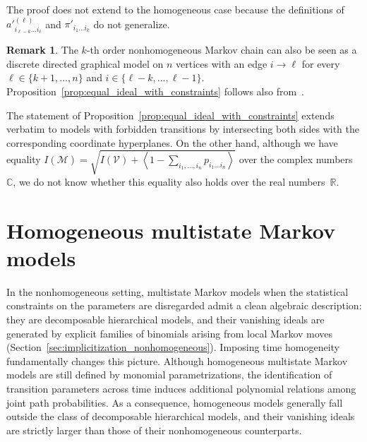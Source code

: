 \documentclass[11pt, a4paper]{article}
\numberwithin{equation}{section}
\theoremstyle{plain}
\theoremstyle{definition}
\newtheorem{remark}[theorem]{Remark}
\begin{document}
The proof does not extend to the homogeneous case because the definitions of $a'^{(\ell)}_{i_{\ell-k}\ldots i_\ell}$ and $\pi'_{i_1\ldots i_k}$ do not generalize.



\begin{remark} \label{rmk:nh_msm_as_graphical_models}
The $k$-th order nonhomogeneous Markov chain can also be seen as a discrete directed graphical model on $n$ vertices with an edge $i \rightarrow \ell$ for every $\ell \in \{k+1,\ldots,n\}$ and $i \in \{\ell-k,\ldots,\ell-1\}$. Proposition~\ref{prop:equal_ideal_with_constraints} follows also from~\cite[Theorem 3.27]{lauritzen1996graphical}.
\end{remark}




The statement of Proposition~\ref{prop:equal_ideal_with_constraints} extends verbatim to models with
forbidden transitions by intersecting both sides with the corresponding coordinate hyperplanes. On the other hand, although we have equality $I(\mathcal{M})=\textstyle{\sqrt{I(\mathcal{V}) + \left\langle 1-\sum_{i_1,\ldots, i_n}p_{i_1\ldots i_n} \right\rangle}}$ over the complex numbers~$\mathbb{C}$, we do not know whether this equality also holds
over the real numbers~$\mathbb{R}$. 







\section{Homogeneous multistate Markov  models}
\label{sec:hom}

In the nonhomogeneous setting, multistate Markov models when the statistical constraints on the parameters are disregarded admit a clean algebraic description:
they are decomposable hierarchical models, and their vanishing ideals are generated by explicit
families of binomials arising from local Markov moves
(Section~\ref{sec:implicitization_nonhomogeneous}).
Imposing time homogeneity fundamentally changes this picture.
Although homogeneous multistate Markov models are still defined by monomial parametrizations,
the identification of transition parameters across time induces additional polynomial relations
among joint path probabilities.
As a consequence, homogeneous models generally fall outside the class of decomposable hierarchical
models, and their vanishing ideals are strictly larger than those of their nonhomogeneous counterparts.
\end{document}
